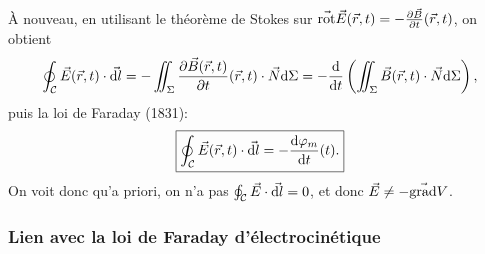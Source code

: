 À nouveau, en utilisant le théorème de Stokes sur $\vec{\mathrm{rot}}\vec{E}(\vec{r},t)=-\frac{\partial\vec{B}}{\partial t}(\vec{r},t)$, on obtient
\begin{equation}
    \oint_{\mathcal{C}}\vec{E}(\vec{r},t)\cdot\vec{\mathrm{d} l}=-\iint_{\Sigma}\frac{\partial\vec{B}(\vec{r},t)}{\partial t}(\vec{r},t)\cdot\vec{N}\mathrm{d}\Sigma=-\frac{\mathrm{d}}{\mathrm{d} t}\left(\iint_{\Sigma}\vec{B}(\vec{r},t)\cdot\vec{N}\mathrm{d}\Sigma\right),
\end{equation}
puis la loi de Faraday (1831):
\begin{equation}
    \boxed{
        \oint_{\mathcal{C}}\vec{E}(\vec{r},t)\cdot\vec{\mathrm{d} l}=-\frac{\mathrm{d}\varphi_m}{\mathrm{d} t}(t).
    }
\end{equation}
On voit donc qu'a priori, on n'a pas $\oint_{\mathcal{C}}\vec{E}\cdot\vec{\mathrm{d} l}=0$, et donc $\vec{E}\neq-\vec{\mathrm{grad}}V$.

\subsubsection{Lien avec la loi de Faraday d'électrocinétique}

